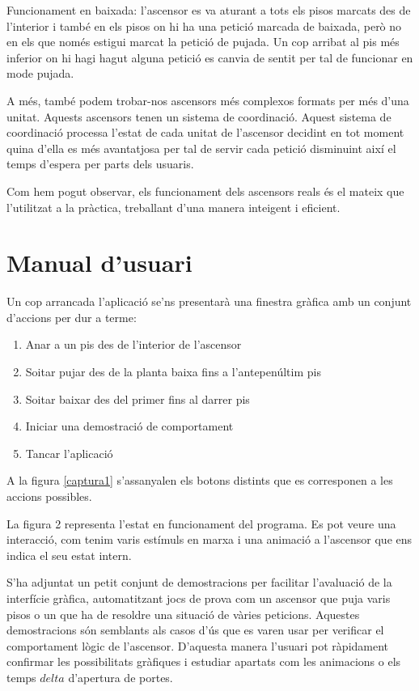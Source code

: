 \documentclass[a4paper, 11pt]{article}
\begin{document}
Funcionament en baixada: l'ascensor es va aturant a tots els pisos marcats des 
de l'interior i també en els pisos on hi ha una petició marcada de baixada, però 
no en els que només estigui marcat la petició de pujada. Un cop arribat al pis 
més inferior on hi hagi hagut alguna petició es canvia de sentit per tal de 
funcionar en mode pujada.

A més, també podem trobar-nos ascensors més complexos formats per més d'una 
unitat. Aquests ascensors tenen un sistema de coordinació. Aquest sistema de 
coordinació processa l'estat de cada unitat de l'ascensor decidint en tot moment 
quina d'ella es més avantatjosa per tal de servir cada petició disminuint així 
el temps d'espera per parts dels usuaris.

Com hem pogut observar, els funcionament dels ascensors reals és el mateix que 
l'utilitzat a la pràctica, treballant d'una manera inte\lgem igent i eficient.

\section{Manual d'usuari}

Un cop arrancada l'aplicació se'ns presentarà una finestra gràfica amb un
conjunt d'accions per dur a terme:

\begin{enumerate}
  \item Anar a un pis des de l'interior de l'ascensor
  \item So\lgem itar pujar des de la planta baixa fins a l'antepenúltim pis
  \item So\lgem itar baixar des del primer fins al darrer pis
  \item Iniciar una demostració de comportament
  \item Tancar l'aplicació 
\end{enumerate}

A la figura \ref{captura1} s'assanyalen els botons distints que es corresponen
a les accions possibles. 

La figura 2 representa l'estat en funcionament del programa. Es pot veure una
interacció, com tenim varis estímuls en marxa i una animació a l'ascensor que
ens indica el seu estat intern.

S'ha adjuntat un petit conjunt de demostracions per facilitar l'avaluació de la
interfície gràfica, automatitzant jocs de prova com un ascensor que puja varis
pisos o un que ha de resoldre una situació de vàries peticions. Aquestes
demostracions són semblants als casos d'ús que es varen usar per verificar el
comportament lògic de l'ascensor. D'aquesta manera l'usuari pot ràpidament
confirmar les possibilitats gràfiques i estudiar apartats com les animacions o
els temps $delta$ d'apertura de portes.
\end{document}
